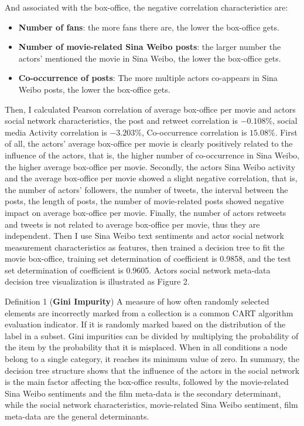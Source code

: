 \documentclass[review]{cvpr}
\begin{document}
And associated with the box-office, the negative correlation characteristics are:
\begin{itemize}
\item {\bf Number of fans}: the more fans there are, the lower the box-office gets.
\item {\bf Number of movie-related Sina Weibo posts}: the larger number the actors' mentioned the movie in Sina Weibo, the lower the box-office gets.
\item {\bf Co-occurrence of posts}: The more multiple actors co-appears in Sina Weibo posts, the lower the box-office gets.
\end{itemize}

\par Then, I calculated Pearson correlation of average box-office per movie and actors social network characteristics, the post and retweet correlation is $-0.108\%$, social media Activity correlation is $-3.203\%$, Co-occurrence correlation is $15.08\%$.
First of all, the actors' average box-office per movie is clearly positively related to the influence of the actors, that is, the higher number of co-occurrence in Sina Weibo, the higher average box-office per movie.
Secondly, the actors Sina Weibo activity and the average box-office per movie showed a slight negative correlation, that is, the number of actors' followers, the number of tweets, the interval between the posts, the length of posts, the number of movie-related posts showed negative impact on average box-office per movie.
Finally, the number of actors retweets and tweets is not related to average box-office per movie, thus they are independent.
Then I use Sina Weibo text sentiments and actor social network measurement characteristics as features, then trained a decision tree to fit the movie box-office, training set determination of coefficient is 0.9858, and the test set determination of coefficient is 0.9605.
Actors social network meta-data decision tree visualization is illustrated as Figure 2.

\par \noindent Definition 1 (\textbf{Gini Impurity}) A measure of how often randomly selected elements are incorrectly marked from a collection is a common CART algorithm evaluation indicator.
If it is randomly marked based on the distribution of the label in a subset.
Gini impurities can be divided by multiplying the probability of the item by the probability that it is misplaced.
When in all conditions a node belong to a single category, it reaches its minimum value of zero.
In summary, the decision tree structure shows that the influence of the actors in the social network is the main factor affecting the box-office results, followed by the movie-related Sina Weibo sentiments and the film meta-data is the secondary determinant,
while the social network characteristics, movie-related Sina Weibo sentiment, film meta-data are the general determinants.
\end{document}
